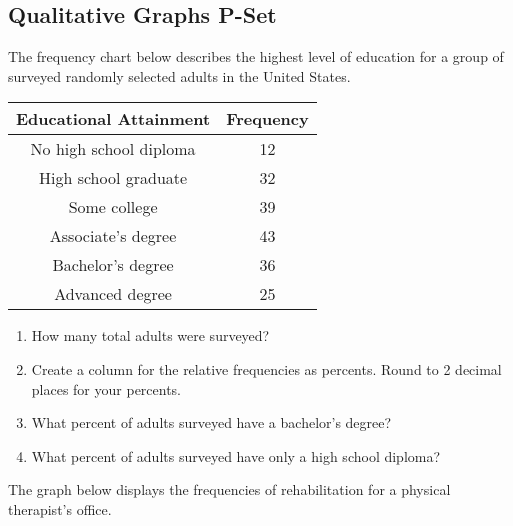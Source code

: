 \documentclass{article}
\newcounter{pset}
\begin{document}
\subsection*{Qualitative Graphs P-Set}

The frequency chart below describes the highest level of education for a group of surveyed randomly selected adults in the United States.

\begin{center}
\begin{tabular}{c|c}
    \textbf{Educational Attainment} & \textbf{Frequency} \\ \hline 
    No high school diploma & 12 \\
    High school graduate & 32 \\
    Some college & 39 \\
    Associate's degree & 43 \\
    Bachelor's degree & 36 \\
    Advanced degree & 25
\end{tabular}
\end{center}

\begin{enumerate}
    \item How many total adults were surveyed?
    \item Create a column for the relative frequencies as percents. Round to 2 decimal places for your percents.
    \item What percent of adults surveyed have a bachelor's degree?
    \item What percent of adults surveyed have only a high school diploma?
\end{enumerate} \setcounter{pset}{\value{enumi}}

\vfill

The graph below displays the frequencies of rehabilitation for a physical therapist's office.

\begin{center}
\end{center}
\end{document}
